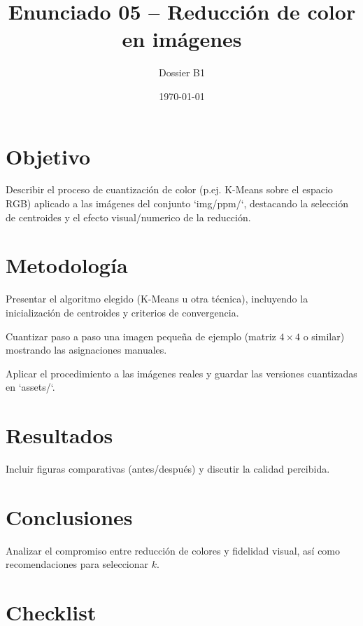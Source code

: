 \documentclass[12pt]{article}
\title{Enunciado 05 -- Reducción de color en imágenes}
\author{Dossier B1}
\date{\today}
\begin{document}
\maketitle
\section{Objetivo}
Describir el proceso de cuantización de color (p.ej. K-Means sobre el espacio RGB) aplicado a las imágenes del conjunto `img/ppm/`, destacando la selección de centroides y el efecto visual/numerico de la reducción.

\section{Metodología}
\begin{pasoapaso}
  \item Presentar el algoritmo elegido (K-Means u otra técnica), incluyendo la inicialización de centroides y criterios de convergencia.
  \item Cuantizar paso a paso una imagen pequeña de ejemplo (matriz $4\times4$ o similar) mostrando las asignaciones manuales.
  \item Aplicar el procedimiento a las imágenes reales y guardar las versiones cuantizadas en `assets/`.
\end{pasoapaso}

\section{Resultados}
Incluir figuras comparativas (antes/después) y discutir la calidad percibida.

\section{Conclusiones}
Analizar el compromiso entre reducción de colores y fidelidad visual, así como recomendaciones para seleccionar $k$.

\section*{Checklist}
\ChecklistBase
\end{document}
